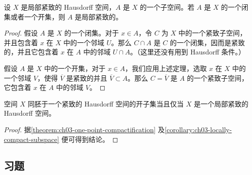 \begin{corollary}\label{corollary:ch03-locally-compact-subspace}
设 $X$ 是局部紧致的 Hausdorff 空间，$A$ 是 $X$ 的一个子空间。若 $A$ 是 $X$ 的一个闭集或者一个开集，则 $A$ 是局部紧致的。
\end{corollary}

\begin{proof}
假设 $A$ 是 $X$ 的一个闭集。对于 $x\in A$，令 $C$ 为 $X$ 中的一个紧致子空间，并且包含着 $x$ 在 $X$ 中的一个邻域 $U$。那么 $C\cap A$ 是 $C$ 的一个闭集，因而是紧致的，并且它包含着 $x$ 在 $A$ 中的邻域 $U\cap A$。（这里还没有用到 Hausdorff 条件。）

假设 $A$ 是 $X$ 中的一个开集，对于 $x\in A$，我们应用上述定理，选取 $x$ 在 $X$ 中的一个邻域 $V$，使得 $\overline{V}$ 是紧致的并且 $\overline{V}\subset A$。那么 $C=\overline{V}$ 是 $A$ 的一个紧致子空间，它包含着 $x$ 在 $A$ 中的邻域 $V$。
\end{proof}

\begin{corollary}\label{corollary:ch03-locally-compact-open-subspace}
空间 $X$ 同胚于一个紧致的 Hausdorff 空间的开子集当且仅当 $X$ 是一个局部紧致的 Hausdorff 空间。
\end{corollary}

\begin{proof}
据\cref{theorem:ch03-one-point-compactification} 及\cref{corollary:ch03-locally-compact-subspace} 便可得到结论。
\end{proof}

\subsection*{习题}

